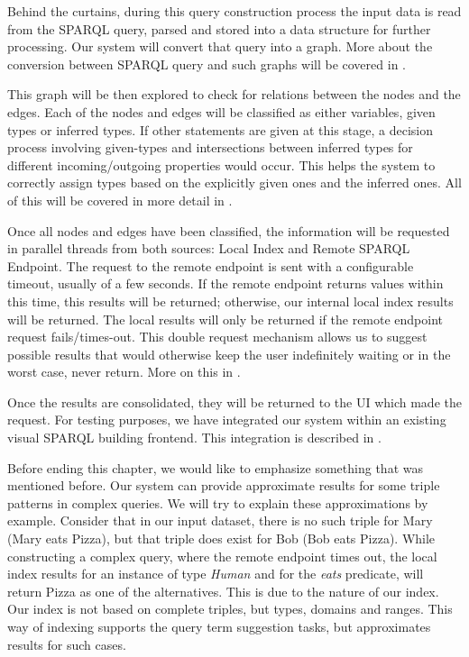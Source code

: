 Behind the curtains, during this query construction process the input data is read from the SPARQL query, parsed and stored into a data structure for further processing. 
Our system will convert that query into a graph. 
More about the conversion between SPARQL query and such graphs will be covered in .

This graph will be then explored to check for relations between the nodes and the edges. 
Each of the nodes and edges will be classified as either variables, given types or inferred types. 
If other statements are given at this stage, a decision process involving given-types and intersections between inferred types for different incoming/outgoing properties would occur. 
This helps the system to correctly assign types based on the explicitly given ones and the inferred ones. 
All of this will be covered in more detail in .

Once all nodes and edges have been classified, the information will be requested in parallel threads from both sources: 
Local Index and Remote SPARQL Endpoint. 
The request to the remote endpoint is sent with a configurable timeout, usually of a few seconds. 
If the remote endpoint returns values within this time, this results will be returned; otherwise, our internal local index results will be returned. The local results will only be returned if the remote endpoint request fails/times-out. 
This double request mechanism allows us to suggest possible results that would otherwise keep the user indefinitely waiting or in the worst case, never return. 
More on this in .

Once the results are consolidated, they will be returned to the UI which made the request. 
For testing purposes, we have integrated our system within an existing visual SPARQL building frontend. 
This integration is described in .

Before ending this chapter, we would like to emphasize something that was mentioned before. 
Our system can provide approximate results for some triple patterns in complex queries. 
We will try to explain these approximations by example. 
Consider that in our input dataset, there is no such triple for Mary (Mary eats Pizza), but that triple does exist for Bob (Bob eats Pizza). 
While constructing a complex query, where the remote endpoint times out, the local index results for an instance of type \textit{Human} and for the \textit{eats} predicate, will return Pizza as one of the alternatives.
This is due to the nature of our index.
Our index is not based on complete triples, but types, domains and ranges.
This way of indexing supports the query term suggestion tasks, but approximates results for such cases.
